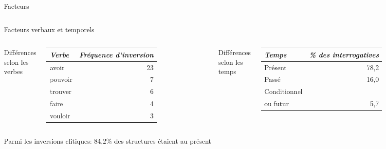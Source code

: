 \documentclass{beamer}
\begin{document}
\begin{frame}[t]{Facteurs}
\begin{columns}
      \end{columns}
    \end{frame}

    \begin{frame}[t]{Facteurs verbaux et temporels}
      \begin{columns}
          \begin{minipage}[t][0.6\textheight]{\linewidth}
            \begin{block}{}
              Différences selon les verbes\phantom{p}
            \end{block}
            \begin{tabular}{l r}
              \emph{Verbe} & \emph{Fréquence d'inversion} \\
              \hline
              avoir        & 23 \\
              pouvoir      & 7 \\
              trouver      & 6 \\
              faire        & 4 \\
              vouloir      & 3
            \end{tabular}
          \end{minipage}
          \begin{minipage}[t][0.6\textheight]{\linewidth}
            \begin{block}{}
              Différences selon les temps
            \end{block}
            \begin{tabular}{l r}
              \emph{Temps} & \emph{\% des interrogatives} \\
              \hline
              Présent      & 78,2 \\
              Passé        & 16,0 \\
              Conditionnel & \\
              ou futur     & 5,7
            \end{tabular}
          \end{minipage}
      \end{columns}
      \begin{block}{}
        Parmi les inversions clitiques: 84,2\% des structures étaient au présent
      \end{block}
    \end{frame}
\end{document}
